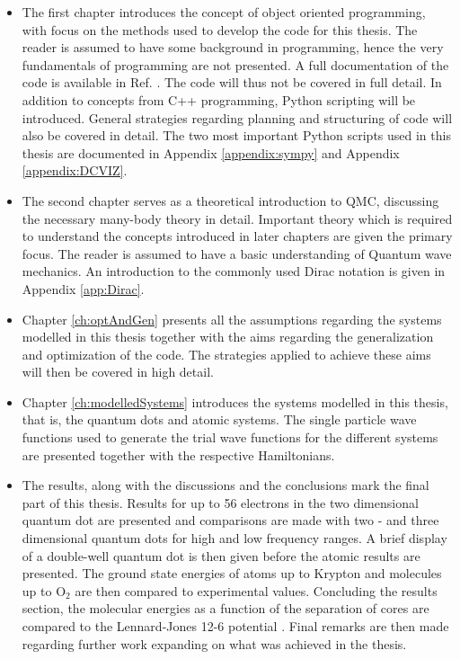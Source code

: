 \begin{itemize}
 \item The first chapter introduces the concept of object oriented programming, with focus on the methods used to develop the code for this thesis. The reader is assumed to have some background in programming, hence the very fundamentals of programming are not presented. A full documentation of the code is available in Ref. \cite{libBorealisCode}. The code will thus not be covered in full detail. In addition to concepts from C++ programming, Python scripting will be introduced. General strategies regarding planning and structuring of code will also be covered in detail. The two most important Python scripts used in this thesis are documented in Appendix \ref{appendix:sympy} and Appendix \ref{appendix:DCVIZ}.
 
 \item The second chapter serves as a theoretical introduction to QMC, discussing the necessary many-body theory in detail. Important theory which is required to understand the concepts introduced in later chapters are given the primary focus. The reader is assumed to have a basic understanding of Quantum wave mechanics. An introduction to the commonly used Dirac notation is given in Appendix \ref{app:Dirac}.
 
 \item Chapter \ref{ch:optAndGen} presents all the assumptions regarding the systems modelled in this thesis together with the aims regarding the generalization and optimization of the code. The strategies applied to achieve these aims will then be covered in high detail.
 
 \item Chapter \ref{ch:modelledSystems} introduces the systems modelled in this thesis, that is, the quantum dots and atomic systems. The single particle wave functions used to generate the trial wave functions for the different systems are presented together with the respective Hamiltonians.
 
 \item The results, along with the discussions and the conclusions mark the final part of this thesis. Results for up to 56 electrons in the two dimensional quantum dot are presented and comparisons are made with two - and three dimensional quantum dots for high and low frequency ranges. A brief display of a double-well quantum dot is then given before the atomic results are presented. The ground state energies of atoms up to Krypton and molecules up to $\mathrm{O_2}$ are then compared to experimental values. Concluding the results section, the molecular energies as a function of the separation of cores are compared to the Lennard-Jones 12-6 potential \cite{MD1, MD2}. Final remarks are then made regarding further work expanding on what was achieved in the thesis. 
\end{itemize}